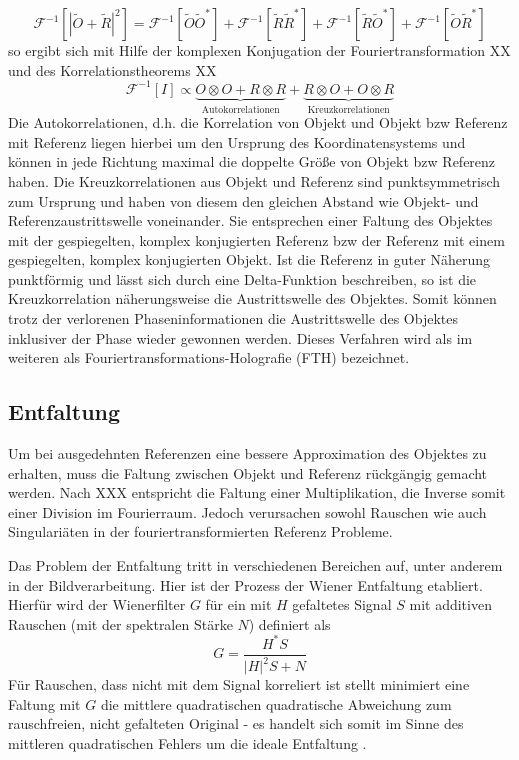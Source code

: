 \begin{equation}
	\mathscr{F}^{-1}\left[\left|\tilde{O}+\tilde{R}\right|^2\right]=
	\mathscr{F}^{-1}\left[\tilde{O}\tilde{O}^*\right]+
	\mathscr{F}^{-1}\left[\tilde{R}\tilde{R}^*\right]+
	\mathscr{F}^{-1}\left[\tilde{R}\tilde{O}^*\right]+
		\mathscr{F}^{-1}\left[\tilde{O}\tilde{R}^*\right]
\end{equation}
so ergibt sich mit Hilfe der komplexen Konjugation der Fouriertransformation XX und des Korrelationstheorems XX
\begin{equation}
\mathscr{F}^{-1}[I]\propto \underbrace{O \otimes O + R\otimes R}_{\text{Autokorrelationen}}+\underbrace{R\otimes O+ O\otimes R}_{\text {Kreuzkorrelationen}}
\end{equation}
Die Autokorrelationen, d.h. die Korrelation von Objekt und Objekt bzw Referenz mit Referenz liegen hierbei um den Ursprung des Koordinatensystems und können in jede Richtung maximal die doppelte Größe von Objekt bzw Referenz haben. Die Kreuzkorrelationen aus Objekt und Referenz sind punktsymmetrisch zum Ursprung und haben von diesem den gleichen Abstand wie Objekt- und Referenzaustrittswelle voneinander.
Sie  entsprechen einer Faltung des Objektes mit der gespiegelten, komplex konjugierten Referenz bzw der Referenz mit einem gespiegelten, komplex konjugierten Objekt.  Ist die Referenz in guter Näherung punktförmig und lässt sich durch eine Delta-Funktion beschreiben, so ist die Kreuzkorrelation näherungsweise die Austrittswelle des Objektes. Somit können trotz der verlorenen Phaseninformationen die Austrittswelle des Objektes inklusiver der Phase wieder gewonnen werden. Dieses Verfahren wird als im weiteren als Fouriertransformations-Holografie (FTH) bezeichnet.
\subsection{Entfaltung}
Um bei ausgedehnten Referenzen eine bessere Approximation des Objektes zu erhalten, muss die Faltung zwischen Objekt und Referenz rückgängig gemacht werden. Nach  XXX entspricht die Faltung einer Multiplikation, die Inverse somit einer Division im Fourierraum. Jedoch verursachen sowohl Rauschen wie auch Singulariäten in der fouriertransformierten Referenz Probleme.

Das Problem der Entfaltung tritt in verschiedenen Bereichen auf, unter anderem in der Bildverarbeitung.
Hier ist der Prozess der Wiener Entfaltung etabliert. Hierfür wird der Wienerfilter $G$ für ein mit $H$ gefaltetes Signal $S$ mit additiven Rauschen (mit der spektralen Stärke $N$) definiert als
\begin{equation}
	G=\frac{H^* S}{\left|H\right|^2 S+N}
\end{equation}
Für Rauschen, dass nicht mit dem Signal korreliert ist stellt minimiert eine Faltung mit $G$ die mittlere quadratischen quadratische Abweichung zum rauschfreien, nicht gefalteten Original - es handelt sich somit im Sinne des mittleren quadratischen Fehlers um die ideale Entfaltung \cite{castleman1996}.

